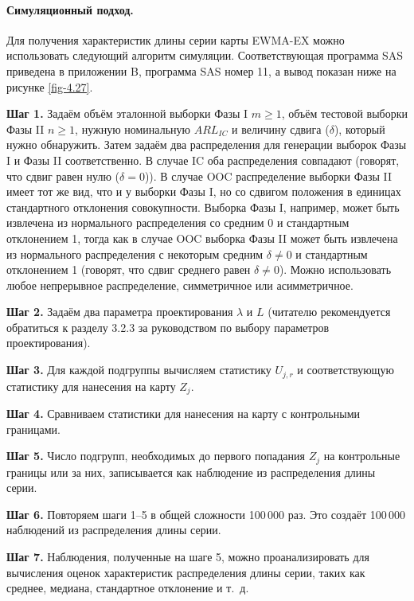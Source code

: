 \paragraph{Симуляционный подход.} Для получения характеристик длины серии карты EWMA-EX можно использовать следующий алгоритм симуляции. Соответствующая программа SAS приведена в приложении B, программа SAS номер 11, а вывод показан ниже на рисунке \ref{fig-4.27}.

\noindent\textbf{Шаг 1.} Задаём объём эталонной выборки Фазы I \(m \ge 1\), объём тестовой выборки Фазы II \(n \ge 1\), нужную номинальную \(ARL_{IC}\) и величину сдвига (\(\delta\)), который нужно обнаружить. Затем задаём два распределения для генерации выборок Фазы I и Фазы II соответственно. В случае IC оба распределения совпадают (говорят, что сдвиг равен нулю (\(\delta = 0\))). В случае OOC распределение выборки Фазы II имеет тот же вид, что и у выборки Фазы I, но со сдвигом положения в единицах стандартного отклонения совокупности. Выборка Фазы I, например, может быть извлечена из нормального распределения со средним 0 и стандартным отклонением 1, тогда как в случае OOC выборка Фазы II может быть извлечена из нормального распределения с некоторым средним \(\delta \ne 0\) и стандартным отклонением 1 (говорят, что сдвиг среднего равен \(\delta \ne 0\)). Можно использовать любое непрерывное распределение, симметричное или асимметричное.

\noindent\textbf{Шаг 2.} Задаём два параметра проектирования \(\lambda\) и \(L\) (читателю рекомендуется обратиться к разделу 3.2.3 за руководством по выбору параметров проектирования).

\noindent\textbf{Шаг 3.} Для каждой подгруппы вычисляем статистику \(U_{j,r}\) и соответствующую статистику для нанесения на карту \(Z_j\).

\noindent\textbf{Шаг 4.} Сравниваем статистики для нанесения на карту с контрольными границами.

\noindent\textbf{Шаг 5.} Число подгрупп, необходимых до первого попадания \(Z_j\) на контрольные границы или за них, записывается как наблюдение из распределения длины серии.

\noindent\textbf{Шаг 6.} Повторяем шаги 1--5 в общей сложности 100\,000 раз. Это создаёт 100\,000 наблюдений из распределения длины серии.

\noindent\textbf{Шаг 7.} Наблюдения, полученные на шаге 5, можно проанализировать для вычисления оценок характеристик распределения длины серии, таких как среднее, медиана, стандартное отклонение и т.~д.

